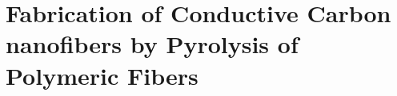 
\chapter{Fabrication of Conductive Carbon nanofibers by Pyrolysis of Polymeric Fibers} %

\label{Chapter:6}

\section{}

